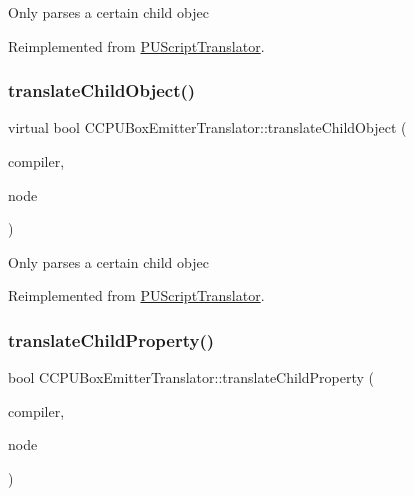Only parses a certain child objec 

Reimplemented from \hyperlink{classPUScriptTranslator_ab587d01348ae3e678cb700c719b2b113}{P\+U\+Script\+Translator}.

\mbox{\label{classCCPUBoxEmitterTranslator_a880e307e7711fd1a0d64819e5076dfda}} 
\subsubsection{\texorpdfstring{translate\+Child\+Object()}{translateChildObject()}\hspace{0.1cm}{\footnotesize\ttfamily [2/2]}}
{\footnotesize\ttfamily virtual bool C\+C\+P\+U\+Box\+Emitter\+Translator\+::translate\+Child\+Object (\begin{DoxyParamCaption}\item[{\hyperlink{classPUScriptCompiler}{P\+U\+Script\+Compiler} $\ast$}]{compiler,  }\item[{\hyperlink{classPUAbstractNode}{P\+U\+Abstract\+Node} $\ast$}]{node }\end{DoxyParamCaption})\hspace{0.3cm}{\ttfamily [virtual]}}

Only parses a certain child objec 

Reimplemented from \hyperlink{classPUScriptTranslator_ab587d01348ae3e678cb700c719b2b113}{P\+U\+Script\+Translator}.

\mbox{\label{classCCPUBoxEmitterTranslator_a9ee6f52bd6ab75316802eb8501775c9e}} 
\subsubsection{\texorpdfstring{translate\+Child\+Property()}{translateChildProperty()}\hspace{0.1cm}{\footnotesize\ttfamily [1/2]}}
{\footnotesize\ttfamily bool C\+C\+P\+U\+Box\+Emitter\+Translator\+::translate\+Child\+Property (\begin{DoxyParamCaption}\item[{\hyperlink{classPUScriptCompiler}{P\+U\+Script\+Compiler} $\ast$}]{compiler,  }\item[{\hyperlink{classPUAbstractNode}{P\+U\+Abstract\+Node} $\ast$}]{node }\end{DoxyParamCaption})\hspace{0.3cm}{\ttfamily [virtual]}}

